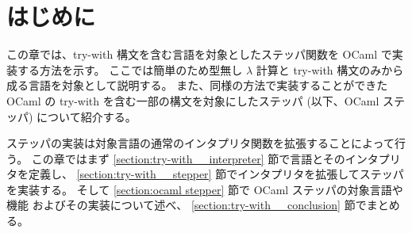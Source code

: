 \section{はじめに}
\label{section:try-with__intro}

この章では、try-with 構文を含む言語を対象としたステッパ関数を
OCaml で実装する方法を示す。
ここでは簡単のため型無し $\lambda$ 計算と try-with 構文のみから成る言語を対象として説明する。
また、同様の方法で実装することができた OCaml の try-with
を含む一部の構文を対象にしたステッパ (以下、OCaml ステッパ) について紹介する。

ステッパの実装は対象言語の通常のインタプリタ関数を拡張することによって行う。
この章ではまず \ref{section:try-with__interpreter} 節で言語とそのインタプリタを定義し、
\ref{section:try-with__stepper} 節でインタプリタを拡張してステッパを実装する。
そして \ref{section:ocaml stepper} 節で OCaml ステッパの対象言語や機能
およびその実装について述べ、 \ref{section:try-with__conclusion} 節でまとめる。
